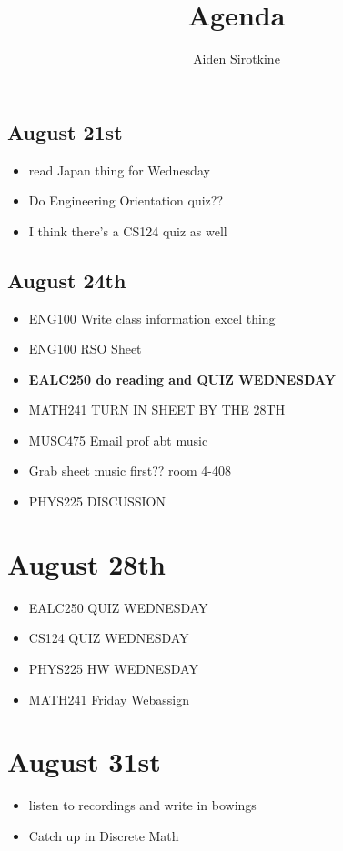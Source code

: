 \documentclass{report}
\date{}
\title{Agenda}
\author{Aiden Sirotkine}
\newcommand{\done}{\textbf{\checkmark}}
\begin{document}
\pagestyle{fancy}
\maketitle
\clearpage

\section*{August 21st}
\begin{itemize}
\item
read Japan thing for Wednesday

\item
Do Engineering Orientation quiz??

\item
I think there's a CS124 quiz as well

\end{itemize}

\newpage
\section*{August 24th}
\begin{itemize}
\item
ENG100 Write class information excel thing \done
\item
ENG100 RSO Sheet \done
\item
\textbf{EALC250 do reading and QUIZ WEDNESDAY}
\item
MATH241 TURN IN SHEET BY THE 28TH \done
\item
MUSC475 Email prof abt music \done
\item
Grab sheet music first?? room 4-408 \done
\item
PHYS225 DISCUSSION \textbf{\checkmark}


\end{itemize}

\chapter{August 28th}
\begin{itemize}
\item
EALC250 QUIZ WEDNESDAY \done
\item
CS124 QUIZ WEDNESDAY \done
\item
PHYS225 HW WEDNESDAY \done
\item
MATH241 Friday Webassign \done

\end{itemize}

\chapter{August 31st}
\begin{itemize}
\item
listen to recordings and write in bowings

\item
Catch up in Discrete Math
\end{itemize}
\end{document}

